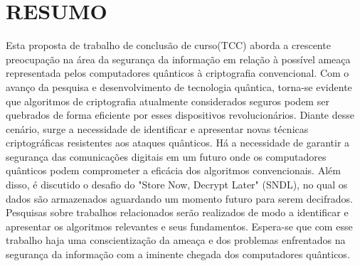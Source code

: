 {\color{cyan}
\section{RESUMO}
\label{sec:resumo}
Esta proposta de trabalho de conclusão de curso(TCC) aborda a crescente preocupação na área da segurança da informação em relação à possível ameaça representada pelos computadores quânticos à criptografia convencional. Com o avanço da pesquisa e desenvolvimento de tecnologia quântica, torna-se evidente que algoritmos de criptografia atualmente considerados seguros podem ser quebrados de forma eficiente por esses dispositivos revolucionários. Diante desse cenário, surge a necessidade de identificar e apresentar novas técnicas criptográficas resistentes aos ataques quânticos. Há a necessidade de garantir a segurança das comunicações digitais em um futuro onde os computadores quânticos podem comprometer a eficácia dos algoritmos convencionais. Além disso, é discutido o desafio do "Store Now, Decrypt Later" (SNDL), no qual os dados são armazenados aguardando um momento futuro para serem decifrados. Pesquisas sobre trabalhos relacionados serão realizados de modo a identificar e apresentar os algoritmos relevantes e seus fundamentos. Espera-se que com esse trabalho haja uma conscientização da ameaça e dos problemas enfrentados na segurança da informação com a iminente chegada dos computadores quânticos.
}

